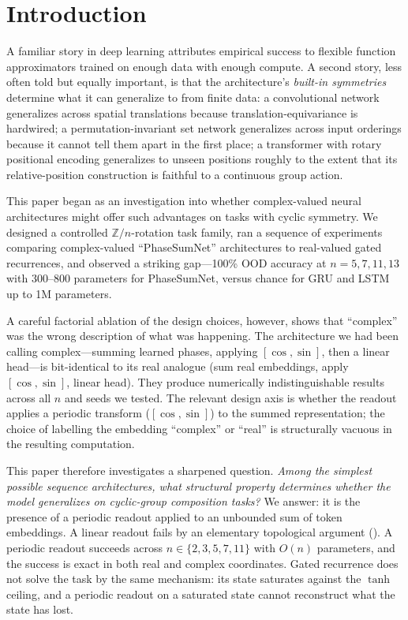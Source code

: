 \documentclass[11pt]{article}
\theoremstyle{definition}
\newcommand{\Z}{\mathbb{Z}}
\begin{document}
\section{Introduction}

A familiar story in deep learning attributes empirical success to
flexible function approximators trained on enough data with enough
compute. A second story, less often told but equally important, is
that the architecture's \emph{built-in symmetries} determine what it
can generalize to from finite data: a convolutional network
generalizes across spatial translations because translation-equivariance
is hardwired; a permutation-invariant set network generalizes across
input orderings because it cannot tell them apart in the first place;
a transformer with rotary positional encoding generalizes
to unseen positions roughly to the extent that its relative-position
construction is faithful to a continuous group action.

This paper began as an investigation into whether complex-valued
neural architectures might offer such advantages on tasks with cyclic
symmetry. We designed a controlled $\Z/n$-rotation task family, ran
a sequence of experiments comparing complex-valued ``PhaseSumNet''
architectures to real-valued gated recurrences, and observed a
striking gap---100\% OOD accuracy at $n=5,7,11,13$ with 300--800
parameters for PhaseSumNet, versus chance for GRU and LSTM up to
1M parameters.

A careful factorial ablation of the design choices, however, shows
that ``complex'' was the wrong description of what was happening.
The architecture we had been calling complex---summing learned
phases, applying $[\cos, \sin]$, then a linear head---is bit-identical
to its real analogue (sum real embeddings, apply $[\cos, \sin]$, linear
head). They produce numerically indistinguishable results across
all $n$ and seeds we tested. The relevant design axis is whether the
readout applies a periodic transform ($[\cos, \sin]$) to the summed
representation; the choice of labelling the embedding ``complex'' or
``real'' is structurally vacuous in the resulting computation.

This paper therefore investigates a sharpened question.
\emph{Among the simplest possible sequence architectures, what
structural property determines whether the model generalizes on
cyclic-group composition tasks?} We answer: it is the presence of a
periodic readout applied to an unbounded sum of token embeddings.
A linear readout fails by an elementary topological argument
(). A periodic readout succeeds across
$n \in \{2,3,5,7,11\}$ with $O(n)$ parameters, and the success is
exact in both real and complex coordinates. Gated recurrence does
not solve the task by the same mechanism: its state saturates
against the $\tanh$ ceiling, and a periodic readout on a saturated
state cannot reconstruct what the state has lost.
\end{document}
